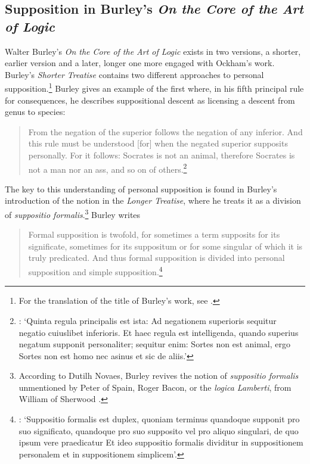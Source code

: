 \documentclass[a4paper, 11pt]{article}
\begin{document}
\subsection{Supposition in Burley's \emph{On the Core of the Art of Logic}}
Walter Burley's \emph{On the Core of the Art of Logic} exists in two versions, a shorter, earlier version and a later, longer one more engaged with Ockham's work. Burley's \emph{Shorter Treatise} contains two different approaches to personal supposition.\footnote{For the translation of the title of Burley's work, see \autocite{SpadeMenn}.} Burley gives an example of the first where, in his fifth principal rule for consequences, he describes suppositional descent as licensing a descent from genus to species:

\begin{quote}
From the negation of the superior follows the negation of any inferior. And this rule must be understood [for] when the negated superior supposits personally. For it follows: Socrates is not an animal, therefore Socrates is not a man nor an ass, and so on of others.\footnote{\autocite[209.35-210.2]{BurleyDPAL}: `Quinta regula principalis est ista: Ad negationem superioris sequitur negatio cuiuslibet inferioris. Et haec regula est intelligenda, quando superius negatum supponit personaliter; sequitur enim: Sortes non est animal, ergo Sortes non est homo nec asinus et sic de aliis.'}
\end{quote} 
The key to this understanding of personal supposition is found in Burley's introduction of the notion in the \emph{Longer Treatise}, where he treats it as a division of \emph{suppositio formalis}.\footnote{According to Dutilh Novaes, Burley revives the notion of \emph{suppositio formalis} unmentioned by Peter of Spain, Roger Bacon, or the \emph{logica Lamberti}, from William of Sherwood \autocite[360]{DutilhNovaes2012c}.} Burley writes
\begin{quote}
Formal supposition is twofold, for sometimes a term supposits for its significate, sometimes for its suppositum or for some singular of which it is truly predicated. And thus formal supposition is divided into personal supposition and simple supposition.\footnote{\autocite[3.1-5]{BurleyDPAL}: `Suppositio formalis est duplex, quoniam terminus quandoque supponit pro suo significato, quandoque pro suo supposito vel pro aliquo singulari, de quo ipsum vere praedicatur Et ideo suppositio formalis dividitur in suppositionem personalem et in suppositionem simplicem'.}
\end{quote}
\end{document}
